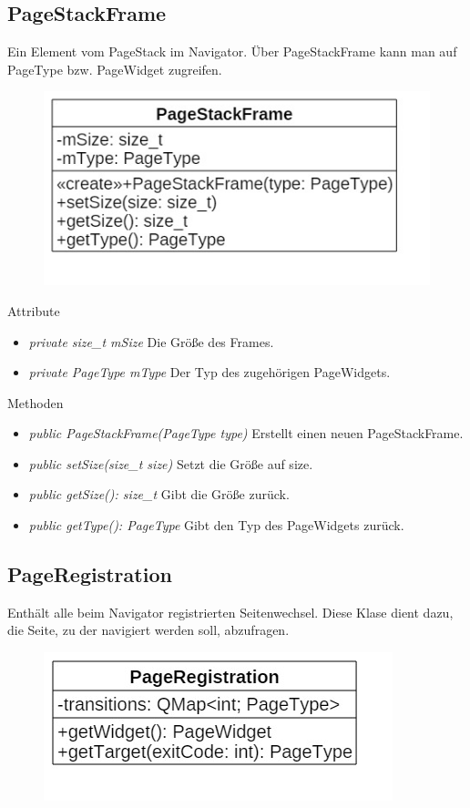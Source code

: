 \subsection*{PageStackFrame}
Ein Element vom PageStack im Navigator. Über PageStackFrame kann man auf PageType bzw. PageWidget zugreifen.

\begin{figure}[H]
\centering
\includegraphics[scale=0.5]{img/Klassendiagramm/Klassen/Controller/PageStackFrame}
\label{fig:pageStackFrame}
\end{figure}

Attribute
\begin{itemize}
	\item\textit{private size\_t mSize}
	Die Größe des Frames.
	\item\textit{private PageType mType}
	Der Typ des zugehörigen PageWidgets.
\end{itemize}

Methoden
\begin{itemize}
	\item\textit{public PageStackFrame(PageType type)}
	Erstellt einen neuen PageStackFrame.
	\item\textit{public setSize(size\_t size)}
	Setzt die Größe auf size.
	\item\textit{public getSize(): size\_t}
	Gibt die Größe zurück.
	\item\textit{public getType(): PageType}
	Gibt den Typ des PageWidgets zurück.
\end{itemize}

\subsection*{PageRegistration}
Enthält alle beim Navigator registrierten Seitenwechsel. Diese Klase dient dazu, die Seite, zu der navigiert werden soll, abzufragen.

\begin{figure}[H]
\centering
\includegraphics[scale=0.5]{img/Klassendiagramm/Klassen/Controller/PageRegistration}
\label{fig:pageRegistration}
\end{figure}

